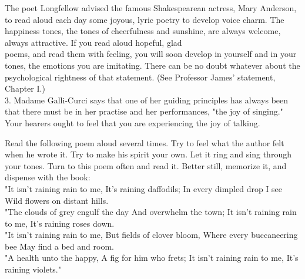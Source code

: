 \documentclass[10pt]{article}
\begin{document}
The poet Longfellow advised the famous Shakespearean actress, Mary Anderson, to read aloud each day some joyous, lyric poetry to develop voice charm. The happiness tones, the tones of cheerfulness and sunshine, are always welcome, always attractive. If you read aloud hopeful, glad\\
poems, and read them with feeling, you will soon develop in yourself and in your tones, the emotions you are imitating. There can be no doubt whatever about the psychological rightness of that statement. (See Professor James' statement, Chapter I.)\\
3. Madame Galli-Curci says that one of her guiding principles has always been that there must be in her practise and her performances, "the joy of singing." Your hearers ought to feel that you are experiencing the joy of talking.

Read the following poem aloud several times. Try to feel what the author felt when he wrote it. Try to make his spirit your own. Let it ring and sing through your tones. Turn to this poem often and read it. Better still, memorize it, and dispense with the book:\\
"It isn't raining rain to me, It's raining daffodils; In every dimpled drop I see Wild flowers on distant hills.\\
"The clouds of grey engulf the day And overwhelm the town; It isn't raining rain to me, It's raining roses down.\\
"It isn't raining rain to me, But fields of clover bloom, Where every buccaneering bee May find a bed and room.\\
"A health unto the happy, A fig for him who frets; It isn't raining rain to me, It's raining violets."
\end{document}
